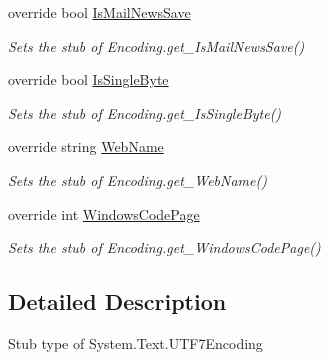 \begin{DoxyCompactItemize}
override bool \hyperlink{class_system_1_1_text_1_1_fakes_1_1_stub_u_t_f7_encoding_a71afa726f298854aa8c63e6c0d5750f8}{Is\-Mail\-News\-Save}
\begin{DoxyCompactList}\small\item\em Sets the stub of Encoding.\-get\-\_\-\-Is\-Mail\-News\-Save()\end{DoxyCompactList}\item 
override bool \hyperlink{class_system_1_1_text_1_1_fakes_1_1_stub_u_t_f7_encoding_af631dfa20b822995ee5d9f9d9007242b}{Is\-Single\-Byte}
\begin{DoxyCompactList}\small\item\em Sets the stub of Encoding.\-get\-\_\-\-Is\-Single\-Byte()\end{DoxyCompactList}\item 
override string \hyperlink{class_system_1_1_text_1_1_fakes_1_1_stub_u_t_f7_encoding_a1bacc75ad8ee913346ad5f15c16de40b}{Web\-Name}
\begin{DoxyCompactList}\small\item\em Sets the stub of Encoding.\-get\-\_\-\-Web\-Name()\end{DoxyCompactList}\item 
override int \hyperlink{class_system_1_1_text_1_1_fakes_1_1_stub_u_t_f7_encoding_a1de5ed7319c71add499985ec504017a3}{Windows\-Code\-Page}
\begin{DoxyCompactList}\small\item\em Sets the stub of Encoding.\-get\-\_\-\-Windows\-Code\-Page()\end{DoxyCompactList}\end{DoxyCompactItemize}


\subsection{Detailed Description}
Stub type of System.\-Text.\-U\-T\-F7\-Encoding



